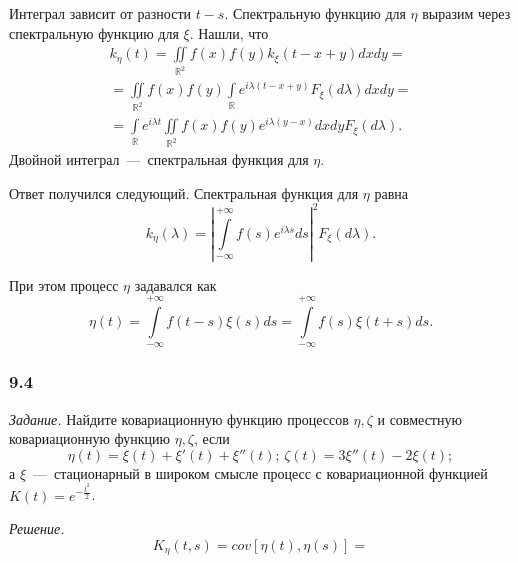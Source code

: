 Интеграл зависит от разности $t - s$.
Спектральную функцию для $ \eta $ выразим через спектральную функцию для $ \xi $.
Нашли, что
\begin{gather*}
  k_{ \eta } \left( t \right) =
  \iint \limits_{ \mathbb{R}^2}
    f \left( x \right) f \left( y \right) k_{ \xi } \left( t - x + y \right) dxdy = \\
  = \iint \limits_{ \mathbb{R}^2}
    f \left( x \right) f \left( y \right)
    \int \limits_{ \mathbb{R}}
      e^{i \lambda \left( t - x + y \right) } F_{ \xi } \left( d \lambda \right) dxdy = \\
  = \int \limits_{ \mathbb{R}}
    e^{i \lambda t} \iint \limits_{ \mathbb{R}^2}
      f \left( x \right) f \left( y \right) e^{i \lambda \left( y - x \right) }
    dxdy F_{ \xi } \left( d \lambda \right).
\end{gather*}
Двойной интеграл~---~спектральная функция для $ \eta $.

Ответ получился следующий.
Спектральная функция для $ \eta $ равна
\begin{equation*}
  k_{ \eta } \left( \lambda \right) =
  \left|
    \int \limits_{-\infty }^{+\infty }
      f \left( s \right) e^{i \lambda s} ds \right|^2 F_{ \xi } \left( d \lambda \right).
\end{equation*}

При этом процесс $ \eta $ задавался как
\begin{equation*}
  \eta \left( t \right) =
  \int \limits_{-\infty }^{+\infty } f \left( t - s \right) \xi \left( s \right) ds =
  \int \limits_{-\infty }^{+\infty } f \left( s \right) \xi \left( t + s \right) ds.
\end{equation*}

\subsubsection*{9.4}

\textit{Задание.}
Найдите ковариационную функцию процессов $ \eta, \zeta $
и совместную ковариационную функцию $ \eta, \zeta $, если
\begin{equation*}
  \eta \left( t \right) =
  \xi \left( t \right) + \xi' \left( t \right) + \xi'' \left( t \right); \,
  \zeta \left( t \right) =
  3 \xi'' \left( t \right) -2 \xi \left( t \right);
\end{equation*}
а $ \xi $~---~стационарный в широком смысле процесс с ковариационной функцией
$K \left( t \right) =
  e^{-\frac{t^2}{2}}$.

\textit{Решение.}
\begin{equation*}
  K_{ \eta } \left( t, s \right) =
  cov \left[ \eta \left( t \right), \eta \left( s \right) \right] =
\end{equation*}

